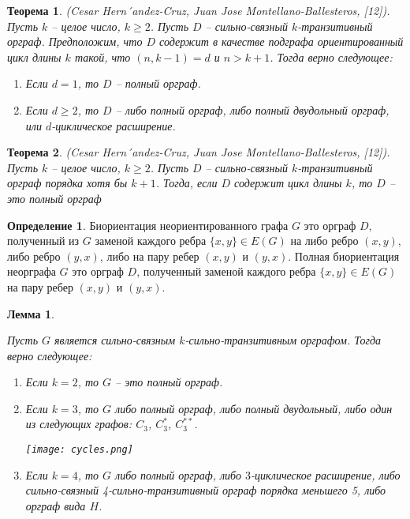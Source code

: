 \documentclass[a4paper,12pt]{article}
\theoremstyle{plain}
\newtheorem{theorem}{Теорема}
\newtheorem{lemma}{Лемма}
\theoremstyle{definition}
\newtheorem{definition}{Определение}
\begin{document}
	
	\begin{theorem}
		{\it (Cesar Hern´andez-Cruz, Juan Jose Montellano-Ballesteros, [12]). Пусть $k$ -- целое число, $k \geq 2$. Пусть $D$ -- сильно-связный $k$-транзитивный орграф.
Предположим, что $D$ содержит в качестве подграфа ориентированный цикл длины $k$ такой, что $(n, k-1) = d$ и $n > k+1$.
Тогда верно следующее:
\begin{enumerate}
\item[1)] Если $d = 1$, то $D$ -- полный орграф.
\item[2)] Если $d \geq  2$, то $D$ -- либо полный орграф, либо полный двудольный орграф, или $d$-циклическое расширение. \end{enumerate}}

	\end{theorem}
	
	\begin{theorem}
		{\it (Cesar Hern´andez-Cruz, Juan Jose Montellano-Ballesteros, [12]). Пусть $k$ -- целое число, $k \geq 2$. Пусть $D$ -- сильно-связный $k$-транзитивный орграф порядка хотя бы $k+1$. Тогда, если $D$ содержит цикл длины $k$, то $D$ -- это полный орграф}

	\end{theorem}
	
	
	\begin{definition}
	Биориентация неориентированного графа $G$ это орграф $D$, полученный из $G$ заменой каждого ребра $ \{x, y\} \in E(G)$ на либо ребро $(x, y)$, либо ребро $(y, x)$, либо на пару ребер $(x, y)$ и $(y, x)$. Полная биориентация неорграфа $G$ это орграф $D$, полученный заменой каждого ребра  $ \{x, y\} \in E(G)$ на пару ребер $(x, y)$ и $(y, x)$.
	\end{definition}
	
	
	
	
	
	
	
	\begin{lemma}\label{t008}
		{\it Пусть $G$ является сильно-связным $k$-сильно-транзитивным орграфом. Тогда верно следующее:
		
		\begin{enumerate}
\item[1)] Если $k=2$, то $G$ -- это полный орграф.
\item[2)] Если $k=3$, то $G$ либо полный орграф, либо полный двудольный, либо один из следующих графов: $C_{3}$, $C_{3}^{*}$, $C_{3}^{**}$.

\begin{center}\texttt{[image: cycles.png]}\end{center} 

\item[3)] Если $k=4$, то $G$ либо полный орграф, либо $3$-циклическое расширение, либо сильно-связный 4-сильно-транзитивный орграф порядка меньшего 5, либо орграф вида $H$.


	




\end{enumerate}}   
	\end{lemma}
	
\end{document}
